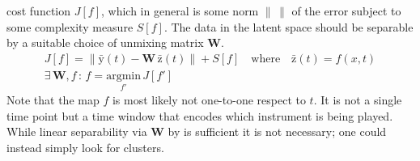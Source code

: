\documentclass{article}[12pt]
\numberwithin{equation}{section}
\begin{document}
cost function $J[f]$, which in general is some norm $\left\lVert\,\right\rVert$
of the error subject to some complexity measure $S[f]$. The data in the latent
space should be separable by a suitable choice of unmixing matrix $\mathbf{W}$.
\begin{align}
	J[f]=\left\lVert\bar{\mathrm{y}}(t)-\mathbf{W}\,\bar{\mathrm{z}}(t)\right\rVert+S[f]
	\quad\text{where}\quad
	\bar{\mathrm{z}}(t) = f(x,t)\\
	\exists\,\mathbf{W},f\,:\,f=\underset{f'}{\mathrm{argmin}}\,J[f']
	\qquad\qquad\qquad
\end{align}
Note that the map $f$ is most likely not one-to-one respect to $t$. It is not a
single time point but a time window that encodes which instrument is being
played. While linear separability via $\mathbf{W}$ by is sufficient it is not
necessary; one could instead simply look for clusters.
\end{document}
